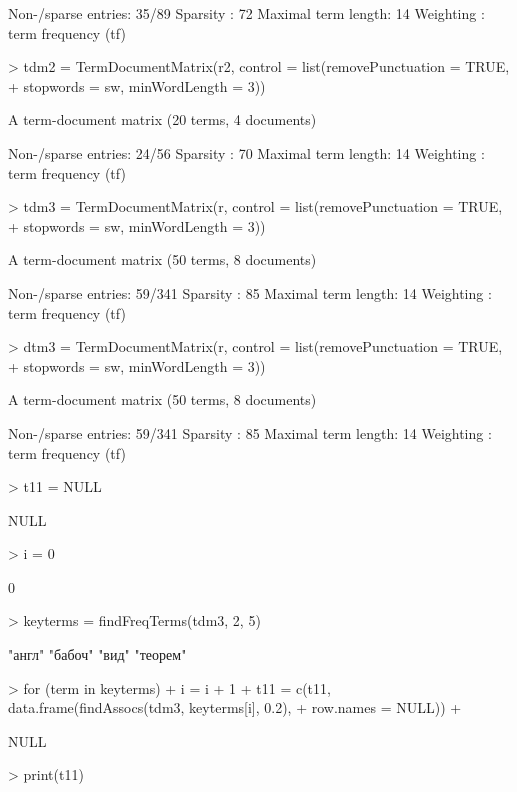 \documentclass[a4paper,11pt]{scrartcl}
\begin{document}
\begin{Schunk}
\begin{Soutput}
Non-/sparse entries: 35/89
Sparsity           : 72%
Maximal term length: 14 
Weighting          : term frequency (tf)
\end{Soutput}
\begin{Sinput}
> tdm2 = TermDocumentMatrix(r2, control = list(removePunctuation = TRUE, 
+     stopwords = sw, minWordLength = 3))
\end{Sinput}
\begin{Soutput}
A term-document matrix (20 terms, 4 documents)

Non-/sparse entries: 24/56
Sparsity           : 70%
Maximal term length: 14 
Weighting          : term frequency (tf)
\end{Soutput}
\begin{Sinput}
> tdm3 = TermDocumentMatrix(r, control = list(removePunctuation = TRUE, 
+     stopwords = sw, minWordLength = 3))
\end{Sinput}
\begin{Soutput}
A term-document matrix (50 terms, 8 documents)

Non-/sparse entries: 59/341
Sparsity           : 85%
Maximal term length: 14 
Weighting          : term frequency (tf)
\end{Soutput}
\begin{Sinput}
> dtm3 = TermDocumentMatrix(r, control = list(removePunctuation = TRUE, 
+     stopwords = sw, minWordLength = 3))
\end{Sinput}
\begin{Soutput}
A term-document matrix (50 terms, 8 documents)

Non-/sparse entries: 59/341
Sparsity           : 85%
Maximal term length: 14 
Weighting          : term frequency (tf)
\end{Soutput}
\begin{Sinput}
> t11 = NULL
\end{Sinput}
\begin{Soutput}
NULL
\end{Soutput}
\begin{Sinput}
> i = 0
\end{Sinput}
\begin{Soutput}
[1] 0
\end{Soutput}
\begin{Sinput}
> keyterms = findFreqTerms(tdm3, 2, 5)
\end{Sinput}
\begin{Soutput}
[1] "англ"   "бабоч"  "вид"    "теорем"
\end{Soutput}
\begin{Sinput}
> for (term in keyterms) {
+     i = i + 1
+     t11 = c(t11, data.frame(findAssocs(tdm3, keyterms[i], 0.2), 
+         row.names = NULL))
+ }
\end{Sinput}
\begin{Soutput}
NULL
\end{Soutput}
\begin{Sinput}
> print(t11)
\end{Sinput}
\end{Schunk}
\end{document}
